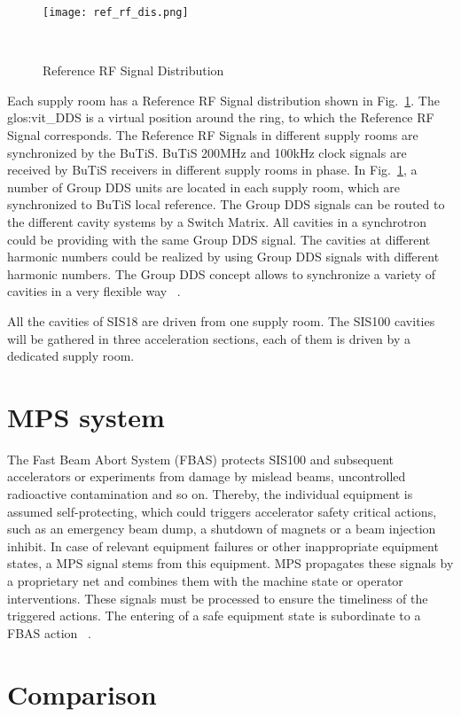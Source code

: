 \begin{figure}[!htb]
   \centering   
   \texttt{[image: ref\_rf\_dis.png]}
   \caption{Reference RF Signal Distribution}{~\cite{klingbeil_new_2011}}
   \label{ref_rf_dis}
\end{figure}
Each supply room has a Reference RF Signal distribution shown in Fig.~\ref{ref_rf_dis}. The \gls{glos:vit_DDS} is a virtual position around the ring, to which the Reference RF Signal corresponds. The Reference RF Signals in different supply rooms are synchronized by the BuTiS. BuTiS 200MHz and 100kHz clock signals are received by BuTiS receivers in different supply rooms in phase. In Fig.~\ref{ref_rf_dis}, a number of Group DDS units are located in each supply room, which are synchronized to BuTiS local reference. The Group DDS signals can be routed to the different cavity systems by a Switch Matrix. All cavities in a synchrotron could be providing with the same Group DDS signal. The cavities at different harmonic numbers could be realized by using Group DDS signals with different harmonic numbers. The Group DDS concept allows to synchronize a variety of cavities in a very flexible way ~\cite{klingbeil_new_2011}. 

All the cavities of SIS18 are driven from one supply room. The SIS100 cavities will be gathered in three acceleration sections, each of them is driven by a dedicated supply room. 

\section{\gls{MPS} system}
The Fast Beam Abort System (\gls{FBAS}) protects SIS100 and subsequent accelerators or experiments from damage by mislead beams, uncontrolled radioactive contamination and so on. Thereby, the individual equipment is assumed self-protecting, which could triggers accelerator safety critical actions, such as an emergency beam dump, a shutdown of magnets or a beam injection inhibit. In case of relevant equipment failures or other inappropriate equipment states, a MPS signal stems from this equipment. MPS propagates these signals by a proprietary net and combines them with the machine state or operator interventions. These signals must be processed to ensure the timeliness of the triggered actions. The entering of a safe equipment state is subordinate to a FBAS action ~\cite{mandakovic_fair_????}.


\section{Comparison}

